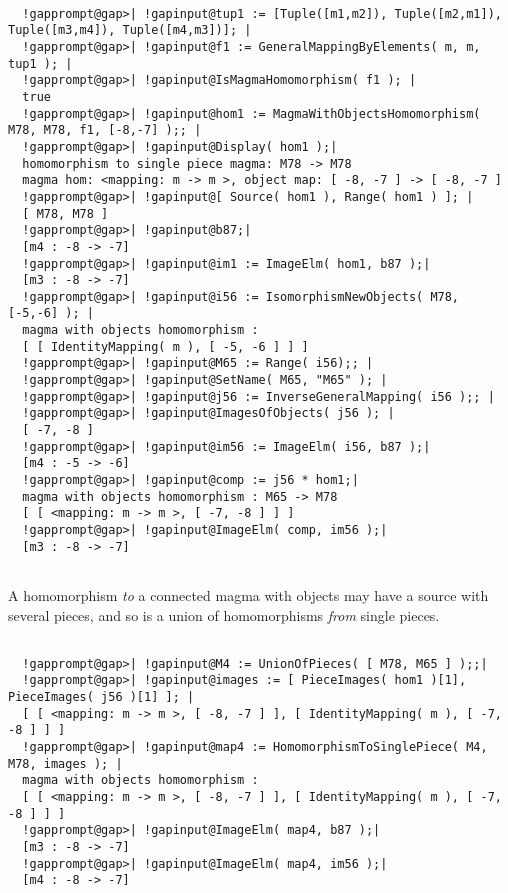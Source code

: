 \documentclass[a4paper,11pt]{report}
\begin{document}
{{{ }

 
\begin{Verbatim}[commandchars=!@|,fontsize=\small,frame=single,label=Example]
  
  !gapprompt@gap>| !gapinput@tup1 := [Tuple([m1,m2]), Tuple([m2,m1]), Tuple([m3,m4]), Tuple([m4,m3])]; |
  !gapprompt@gap>| !gapinput@f1 := GeneralMappingByElements( m, m, tup1 ); |
  !gapprompt@gap>| !gapinput@IsMagmaHomomorphism( f1 ); |
  true
  !gapprompt@gap>| !gapinput@hom1 := MagmaWithObjectsHomomorphism( M78, M78, f1, [-8,-7] );; |
  !gapprompt@gap>| !gapinput@Display( hom1 );|
  homomorphism to single piece magma: M78 -> M78
  magma hom: <mapping: m -> m >, object map: [ -8, -7 ] -> [ -8, -7 ]
  !gapprompt@gap>| !gapinput@[ Source( hom1 ), Range( hom1 ) ]; |
  [ M78, M78 ]
  !gapprompt@gap>| !gapinput@b87;|
  [m4 : -8 -> -7]
  !gapprompt@gap>| !gapinput@im1 := ImageElm( hom1, b87 );|
  [m3 : -8 -> -7]
  !gapprompt@gap>| !gapinput@i56 := IsomorphismNewObjects( M78, [-5,-6] ); |
  magma with objects homomorphism : 
  [ [ IdentityMapping( m ), [ -5, -6 ] ] ]
  !gapprompt@gap>| !gapinput@M65 := Range( i56);; |
  !gapprompt@gap>| !gapinput@SetName( M65, "M65" ); |
  !gapprompt@gap>| !gapinput@j56 := InverseGeneralMapping( i56 );; |
  !gapprompt@gap>| !gapinput@ImagesOfObjects( j56 ); |
  [ -7, -8 ]
  !gapprompt@gap>| !gapinput@im56 := ImageElm( i56, b87 );|
  [m4 : -5 -> -6]
  !gapprompt@gap>| !gapinput@comp := j56 * hom1;|
  magma with objects homomorphism : M65 -> M78
  [ [ <mapping: m -> m >, [ -7, -8 ] ] ]
  !gapprompt@gap>| !gapinput@ImageElm( comp, im56 );|
  [m3 : -8 -> -7]
  
\end{Verbatim}
 A homomorphism \emph{to} a connected magma with objects may have a source with several pieces, and so
is a union of homomorphisms \emph{from} single pieces. 

 
\begin{Verbatim}[commandchars=!@|,fontsize=\small,frame=single,label=Example]
  
  !gapprompt@gap>| !gapinput@M4 := UnionOfPieces( [ M78, M65 ] );;|
  !gapprompt@gap>| !gapinput@images := [ PieceImages( hom1 )[1], PieceImages( j56 )[1] ]; |
  [ [ <mapping: m -> m >, [ -8, -7 ] ], [ IdentityMapping( m ), [ -7, -8 ] ] ]
  !gapprompt@gap>| !gapinput@map4 := HomomorphismToSinglePiece( M4, M78, images ); |
  magma with objects homomorphism : 
  [ [ <mapping: m -> m >, [ -8, -7 ] ], [ IdentityMapping( m ), [ -7, -8 ] ] ]
  !gapprompt@gap>| !gapinput@ImageElm( map4, b87 );|
  [m3 : -8 -> -7]
  !gapprompt@gap>| !gapinput@ImageElm( map4, im56 );|
  [m4 : -8 -> -7]
  

\end{Verbatim}}}
\end{document}
